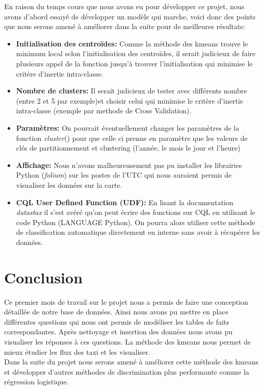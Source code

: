 \documentclass[]{report}
\begin{document}
	En raison du temps cours que  nous avons eu pour développer ce projet, nous avons d'abord essayé de développer un modèle qui marche, voici donc des points que nous  serons amené à  améliorer dans la suite pour de meilleures résultats:
	\begin{itemize}
		\item \textbf{Initialisation des centroïdes:} Comme la méthode des kmeans trouve le minimum local selon l'initialisation des centroïdes, il serait judicieux de faire plusieurs appel de la fonction jusqu'à trouver l'initialisation qui minimise le critère d'inertie intra-classe.
		\item \textbf{Nombre de clusters:}  Il serait judicieux de tester avec différents nombre (entre 2 et 5 par exemple)et choisir celui qui minimise le critère d'inertie intra-classe  (exemple par methode de Cross Validation).
		\item \textbf{Paramètres:} On pourrait éventuellement changer les paramètres de la fonction \textit{cluster}() pour que celle ci prenne en paramètre que les valeurs de clés de partitionnement  et clustering (l'année, le mois le jour et l'heure)
		\item \textbf{Affichage:} Nous n'avons malheureusement pas pu installer les librairies Python (\textit{folium}) sur les postes de l'UTC qui nous auraient permis de visualiser les données sur la carte.
		\item \textbf{CQL User Defined Function (UDF):} En lisant la documentation \textit{datastax} il s'est avéré qu'on peut écrire des fonctions sur CQL en utilisant le code Python (LANGUAGE Python). On pourra alors utiliser cette méthode de classification automatique directement en interne sans avoir à récupérer les données.
	\end{itemize}
	
	\section{Conclusion}
	Ce premier mois de travail sur le projet nous a permis de faire une conception détaillée de notre base de données. Ainsi nous avons pu mettre en place différentes questions qui nous ont permis de modéliser les tables de faits correspondantes. Après nettoyage et insertion des données nous avons pu visualiser les réponses à ces questions. La méthode des kmeans nous permet de mieux étudier les flux des taxi et les visualiser.\\
	Dans la suite du projet nous serons amené à améliorer cette méthode des kmeans et développer d'autres méthodes de discrimination plus performante comme la régression logistique.
	
\end{document}
